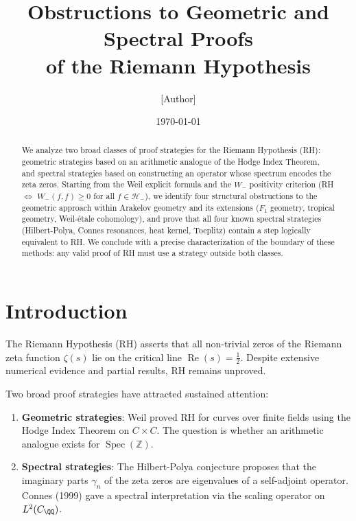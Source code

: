 \documentclass[12pt]{article}
\title{Obstructions to Geometric and Spectral Proofs\\
of the Riemann Hypothesis}
\author{[Author]}
\date{\today}
\DeclareMathOperator{\Spec}{Spec}
\DeclareMathOperator{\Re}{Re}
\newcommand{\ZZ}{\mathbb{Z}}
\begin{document}
\maketitle

\begin{abstract}
We analyze two broad classes of proof strategies for the Riemann Hypothesis
(RH): geometric strategies based on an arithmetic analogue of the Hodge Index
Theorem, and spectral strategies based on constructing an operator whose
spectrum encodes the zeta zeros. Starting from the Weil explicit formula and
the $W_-$ positivity criterion (RH $\Leftrightarrow$ $W_-(f,f) \geq 0$ for
all $f \in \mathcal{H}_-$), we identify four structural obstructions to the
geometric approach within Arakelov geometry and its extensions ($F_1$ geometry,
tropical geometry, Weil-\'etale cohomology), and prove that all four known
spectral strategies (Hilbert-Polya, Connes resonances, heat kernel, Toeplitz)
contain a step logically equivalent to RH. We conclude with a precise
characterization of the boundary of these methods: any valid proof of RH must
use a strategy outside both classes.
\end{abstract}

\tableofcontents

\section{Introduction}

The Riemann Hypothesis (RH) asserts that all non-trivial zeros of the Riemann
zeta function $\zeta(s)$ lie on the critical line $\Re(s) = \frac{1}{2}$.
Despite extensive numerical evidence and partial results, RH remains unproved.

Two broad proof strategies have attracted sustained attention:

\begin{enumerate}
\item \textbf{Geometric strategies}: Weil proved RH for curves over finite
fields using the Hodge Index Theorem on $C \times C$. The question is whether
an arithmetic analogue exists for $\Spec(\ZZ)$.

\item \textbf{Spectral strategies}: The Hilbert-Polya conjecture proposes that
the imaginary parts $\gamma_n$ of the zeta zeros are eigenvalues of a
self-adjoint operator. Connes (1999) gave a spectral interpretation via the
scaling operator on $L^2(C_\QQ)$.
\end{enumerate}
\end{document}
